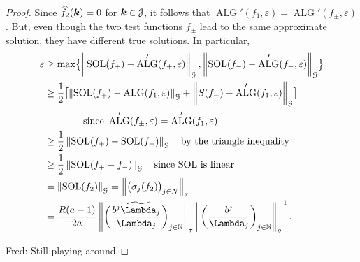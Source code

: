 \documentclass[USenglish]{article}
\theoremstyle{dgthm}
\theoremstyle{dgthm}
\theoremstyle{dgthm}
\theoremstyle{dgthm}
\theoremstyle{dgdef}
\DeclareMathOperator{\SOL}{SOL}
\DeclareMathOperator{\ALG}{ALG}
\newcommand{\hf}{\widehat{f}}
\newcommand{\norm}[2][{}]{\ensuremath{\left \lVert #2 \right \rVert}_{#1}}
\newcommand{\FredNote}[1]{{\color{blue}Fred: #1}}
\newcommand{\tLambda}{\widetilde{\Lambda}}
\begin{document}
\begin{proof}
Since $\hf_2(\bsk) = 0$ for ${\boldsymbol{k}} \in {\mathcal{J}}$, it follows that $\ALG'(f_1,\varepsilon) = \ALG'(f_\pm,\varepsilon)$.  But, even though the two test functions $f_\pm$ lead to the same approximate solution, they have different true solutions.  In particular,
\begin{align*}
\varepsilon &\ge \max \bigl\{\norm[\calG]{\SOL(f_+) - \ALG'(f_+,\varepsilon)}, \norm[\calG]{\SOL(f_-) - \ALG'(f_-,\varepsilon)} \bigr\} \\
&\ge \frac 12 \bigl[\norm[\calG]{\SOL(f_+) - \ALG(f_1,\varepsilon)} + \norm[\calG]{S(f_-) - \ALG'(f_1,\varepsilon)}  \bigr] \\
&\qquad \qquad \text{since } \ALG'(f_\pm,\varepsilon) = \ALG'(f_1,\varepsilon) \\
&\ge \frac 12 \norm[\calG]{\SOL(f_+) - \SOL(f_-)} \quad \text{by the triangle inequality}\\
&\ge \frac 12 \norm[\calG]{\SOL(f_+ - f_-)} \quad \text{since $\SOL$ is linear}\\
&= \norm[\calG]{\SOL(f_2)} = \norm[\tau]{\bigl( \sigma_j(f_2) \bigr)_{j \in N}} \\
& = 
\frac{R(a-1)}{2a} \norm[\tau]{ \biggl(\frac{b^{j}\tLambda_j}{\Lambda_j} \biggr)_{j \in \N}} \norm[\rho]{ \biggl(\frac{b^{j}}{\Lambda_j} \biggr)_{j \in \N}}^{-1}.
\end{align*}


\FredNote{Still playing around}


\end{proof}
\end{document}

